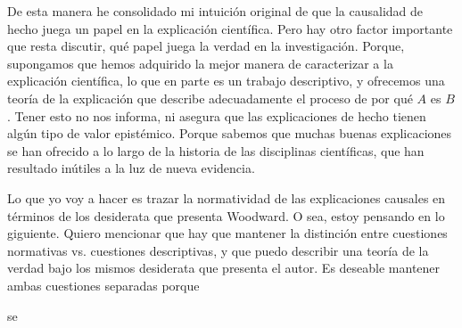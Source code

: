 De esta manera he consolidado mi intuición original de que 
la causalidad de hecho juega un papel en la
explicación científica. Pero hay otro factor importante que
resta discutir, qué papel juega la verdad en la
investigación. Porque, supongamos que hemos adquirido la
mejor manera de caracterizar a la explicación científica, lo
que en parte es un trabajo descriptivo, y ofrecemos una 
teoría de la explicación que describe adecuadamente el
proceso de  por qué $ A $
es $ B $. Tener esto no nos informa, ni asegura que las
explicaciones de hecho tienen algún tipo de valor
epistémico. Porque sabemos que muchas buenas explicaciones
se han ofrecido a lo largo de la historia de las disciplinas
científicas, que han resultado inútiles a la luz de nueva
evidencia. 


Lo que yo voy a hacer es trazar la normatividad de las
explicaciones causales en términos de los desiderata que
presenta Woodward. O sea, estoy pensando en lo giguiente.
Quiero mencionar que hay que mantener la distinción entre
cuestiones normativas vs. cuestiones descriptivas, y que
puedo describir una teoría de la verdad bajo los mismos
desiderata que presenta el autor. Es deseable mantener ambas
cuestiones separadas porque 



se 




